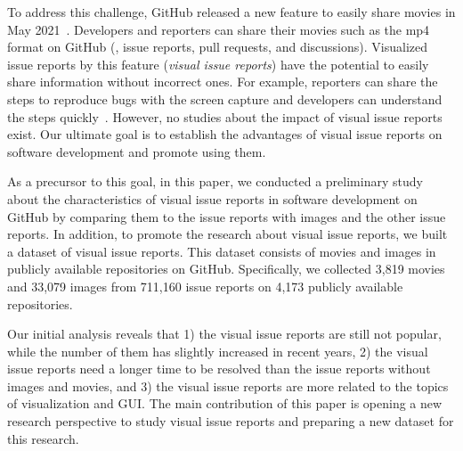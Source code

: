 To address this challenge, GitHub released a new feature 
to easily share movies in May 2021~\citep{github-video-blog}. 
Developers and reporters can share their movies such as the mp4 format 
on GitHub (\eg,  issue reports, pull requests, and discussions). 
Visualized issue reports by this feature
(\textit{visual issue reports}) have the potential to 
easily share information without incorrect ones.  
For example, reporters can share the steps to reproduce bugs 
with the screen capture and developers can understand 
the steps quickly~\citep{github-video-blog}.
However, no studies about the impact of visual issue reports exist. 
Our ultimate goal is to establish the advantages of visual issue reports 
on software development and promote using them.





As a precursor to this goal, in this paper, 
we conducted a preliminary study about the characteristics of 
visual issue reports in software development on GitHub
by comparing them to the issue reports with images and 
the other issue reports. 
In addition, to promote the research about visual issue reports, 
we built a dataset of visual issue reports. 
This dataset consists of movies and images 
in publicly available repositories on GitHub. 
Specifically, we collected 
3,819 movies and 
33,079 images from 
711,160 issue reports on
4,173 publicly available repositories.

Our initial analysis reveals that 
1) the visual issue reports are still not popular,
while the number of them has slightly increased in recent years, 
2) the visual issue reports need 
a longer time to be resolved than the issue reports without images and movies, and 
3) the visual issue reports are more related to 
the topics of visualization and GUI. 
The main contribution of this paper is 
opening a new research perspective to study visual issue reports
and preparing a new dataset for this research. 